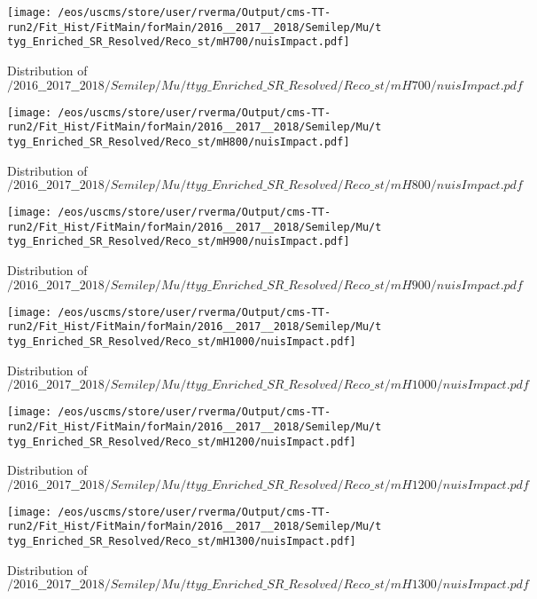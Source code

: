 \begin{figure}
\centering
\texttt{[image: /eos/uscms/store/user/rverma/Output/cms-TT-run2/Fit\_Hist/FitMain/forMain/2016\_\_2017\_\_2018/Semilep/Mu/ttyg\_Enriched\_SR\_Resolved/Reco\_st/mH700/nuisImpact.pdf]}
\caption{Distribution of $/2016\_\_2017\_\_2018/Semilep/Mu/ttyg\_Enriched\_SR\_Resolved/Reco\_st/mH700/nuisImpact.pdf$}
\end{figure}

\begin{figure}
\centering
\texttt{[image: /eos/uscms/store/user/rverma/Output/cms-TT-run2/Fit\_Hist/FitMain/forMain/2016\_\_2017\_\_2018/Semilep/Mu/ttyg\_Enriched\_SR\_Resolved/Reco\_st/mH800/nuisImpact.pdf]}
\caption{Distribution of $/2016\_\_2017\_\_2018/Semilep/Mu/ttyg\_Enriched\_SR\_Resolved/Reco\_st/mH800/nuisImpact.pdf$}
\end{figure}

\begin{figure}
\centering
\texttt{[image: /eos/uscms/store/user/rverma/Output/cms-TT-run2/Fit\_Hist/FitMain/forMain/2016\_\_2017\_\_2018/Semilep/Mu/ttyg\_Enriched\_SR\_Resolved/Reco\_st/mH900/nuisImpact.pdf]}
\caption{Distribution of $/2016\_\_2017\_\_2018/Semilep/Mu/ttyg\_Enriched\_SR\_Resolved/Reco\_st/mH900/nuisImpact.pdf$}
\end{figure}

\begin{figure}
\centering
\texttt{[image: /eos/uscms/store/user/rverma/Output/cms-TT-run2/Fit\_Hist/FitMain/forMain/2016\_\_2017\_\_2018/Semilep/Mu/ttyg\_Enriched\_SR\_Resolved/Reco\_st/mH1000/nuisImpact.pdf]}
\caption{Distribution of $/2016\_\_2017\_\_2018/Semilep/Mu/ttyg\_Enriched\_SR\_Resolved/Reco\_st/mH1000/nuisImpact.pdf$}
\end{figure}

\begin{figure}
\centering
\texttt{[image: /eos/uscms/store/user/rverma/Output/cms-TT-run2/Fit\_Hist/FitMain/forMain/2016\_\_2017\_\_2018/Semilep/Mu/ttyg\_Enriched\_SR\_Resolved/Reco\_st/mH1200/nuisImpact.pdf]}
\caption{Distribution of $/2016\_\_2017\_\_2018/Semilep/Mu/ttyg\_Enriched\_SR\_Resolved/Reco\_st/mH1200/nuisImpact.pdf$}
\end{figure}

\begin{figure}
\centering
\texttt{[image: /eos/uscms/store/user/rverma/Output/cms-TT-run2/Fit\_Hist/FitMain/forMain/2016\_\_2017\_\_2018/Semilep/Mu/ttyg\_Enriched\_SR\_Resolved/Reco\_st/mH1300/nuisImpact.pdf]}
\caption{Distribution of $/2016\_\_2017\_\_2018/Semilep/Mu/ttyg\_Enriched\_SR\_Resolved/Reco\_st/mH1300/nuisImpact.pdf$}
\end{figure}

